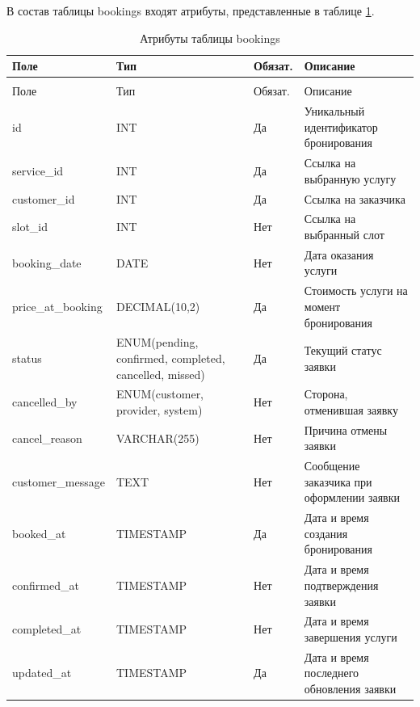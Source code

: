 В состав таблицы bookings входят атрибуты, представленные в таблице \ref{bookings:table}.

\begin{longtable}{|>{\raggedright\arraybackslash}p{3.8cm}|>{\raggedright\arraybackslash}p{4.0cm}|>{\centering\arraybackslash}p{2.0cm}|>{\raggedright\arraybackslash}p{5.2cm}|}
	\caption{Атрибуты таблицы bookings}\label{bookings:table} \\ \hline
	\centering Поле & \centering Тип & \centering Обязат. & \centering\arraybackslash Описание \\ \hline
	\endfirsthead
	\multicolumn{4}{l}{Продолжение таблицы \ref{bookings:table}} \\ \hline
	\centering Поле & \centering Тип & \centering Обязат. & \centering\arraybackslash Описание \\ \hline
	\endhead
	id & INT & Да & Уникальный идентификатор бронирования \\ \hline
	service\_id & INT & Да & Ссылка на выбранную услугу \\ \hline
	customer\_id & INT & Да & Ссылка на заказчика \\ \hline
	slot\_id & INT & Нет & Ссылка на выбранный слот \\ \hline
	booking\_date & DATE & Нет & Дата оказания услуги \\ \hline
	price\_at\_booking & DECIMAL(10,2) & Да & Стоимость услуги на момент бронирования \\ \hline
	status & ENUM(pending, confirmed, completed, cancelled, missed) & Да & Текущий статус заявки \\ \hline
	cancelled\_by & ENUM(customer, provider, system) & Нет & Сторона, отменившая заявку \\ \hline
	cancel\_reason & VARCHAR(255) & Нет & Причина отмены заявки \\ \hline
	customer\_message & TEXT & Нет & Сообщение заказчика при оформлении заявки \\ \hline
	booked\_at & TIMESTAMP & Да & Дата и время создания бронирования \\ \hline
	confirmed\_at & TIMESTAMP & Нет & Дата и время подтверждения заявки \\ \hline
	completed\_at & TIMESTAMP & Нет & Дата и время завершения услуги \\ \hline
	updated\_at & TIMESTAMP & Да & Дата и время последнего обновления заявки \\ \hline
\end{longtable}

